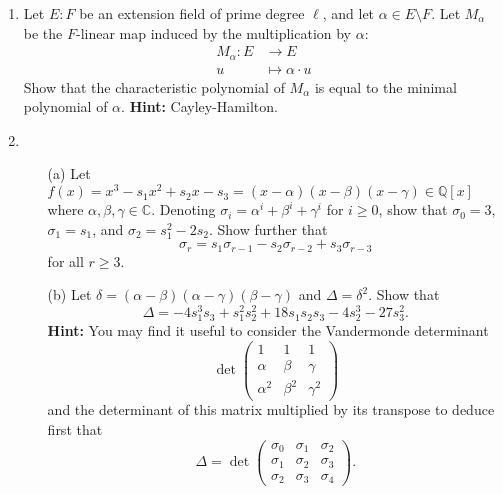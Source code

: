 \documentclass{article}
\begin{document}
\begin{enumerate}
\item Let $E : F$ be an extension field of prime degree $\ell$, and let $\alpha \in E \setminus F$. Let $M_\alpha$ be the $F$-linear map induced by the multiplication by $\alpha$:
\[
\begin{aligned}
M_\alpha : E &\longrightarrow E \\
u &\mapsto \alpha \cdot u
\end{aligned}
\]
Show that the characteristic polynomial of $M_\alpha$ is equal to the minimal polynomial of $\alpha$. \textbf{Hint:} Cayley-Hamilton.

\item
\begin{enumerate}
    \item[(a)] Let $f(x) = x^3 - s_1 x^2 + s_2 x - s_3 = (x - \alpha)(x - \beta)(x - \gamma) \in \mathbb{Q}[x]$ where $\alpha, \beta, \gamma \in \mathbb{C}$. Denoting $\sigma_i = \alpha^i + \beta^i + \gamma^i$ for $i \geq 0$, show that $\sigma_0 = 3$, $\sigma_1 = s_1$, and $\sigma_2 = s_1^2 - 2s_2$. Show further that
    \[
    \sigma_r = s_1 \sigma_{r-1} - s_2 \sigma_{r-2} + s_3 \sigma_{r-3}
    \]
    for all $r \geq 3$.

    \item[(b)] Let $\delta = (\alpha - \beta)(\alpha - \gamma)(\beta - \gamma)$ and $\Delta = \delta^2$. Show that
    \[
    \Delta = -4s_1^3 s_3 + s_1^2 s_2^2 + 18s_1 s_2 s_3 - 4s_2^3 - 27s_3^2.
    \]
    \textbf{Hint:} You may find it useful to consider the Vandermonde determinant
    \[
    \operatorname{det} \begin{pmatrix}
    1 & 1 & 1 \\
    \alpha & \beta & \gamma \\
    \alpha^2 & \beta^2 & \gamma^2
    \end{pmatrix}
    \]
    and the determinant of this matrix multiplied by its transpose to deduce first that
    \[
    \Delta = \operatorname{det} \begin{pmatrix}
    \sigma_0 & \sigma_1 & \sigma_2 \\
    \sigma_1 & \sigma_2 & \sigma_3 \\
    \sigma_2 & \sigma_3 & \sigma_4
    \end{pmatrix}.
    \]
\end{enumerate}
\end{enumerate}
\end{document}
